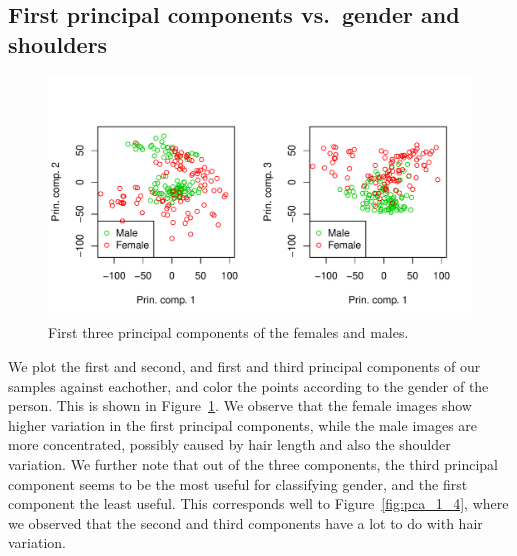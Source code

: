 \documentclass[a4paper]{article}\usepackage[]{graphicx}\usepackage[]{color}
\makeatletter
\def\maxwidth{ %
  \ifdim\Gin@nat@width>\linewidth
    \linewidth
  \else
    \Gin@nat@width
  \fi
}
\newenvironment{knitrout}{}{} %
\makeatother
\begin{document}
\subsection{First principal components vs.\ gender and shoulders}

\begin{knitrout}
\color{fgcolor}\begin{figure}

{\centering \includegraphics[width=\maxwidth]{figure/gender_components-1} 

}

\caption[First three principal components of the females and males]{First three principal components of the females and males.}\label{fig:gender_components}
\end{figure}


\end{knitrout}

We plot the first and second, and first and third principal components of our samples against eachother, and color the points according to the gender of the person. This is shown in Figure~\ref{fig:gender_components}. We observe that the female images show higher variation in the first principal components, while the male images are more concentrated, possibly caused by hair length and also the shoulder variation. We further note that out of the three components, the third principal component seems to be the most useful for classifying gender, and the first component the least useful. This corresponds well to Figure~\ref{fig:pca_1_4}, where we observed that the second and third components have a lot to do with hair variation.
\end{document}
